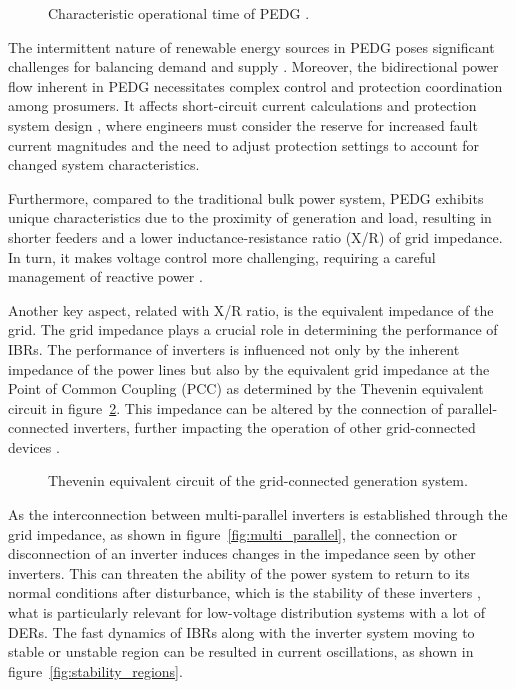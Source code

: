 \begin{figure}[ht]
    \caption{Characteristic operational time of PEDG \autocite{misc_karawita_2024}.}\label{fig:pedg_time}
\end{figure}

The intermittent nature of renewable energy sources in PEDG poses significant challenges for balancing demand and supply \autocite{7790991,7442160}. Moreover, the bidirectional power flow inherent in PEDG necessitates complex control and protection coordination among prosumers. It affects short-circuit current calculations and protection system design \autocite{4112346}, where engineers must consider the reserve for increased fault current magnitudes and the need to adjust protection settings to account for changed system characteristics. 

Furthermore, compared to the traditional bulk power system, PEDG exhibits unique characteristics due to the proximity of generation and load, resulting in shorter feeders and a lower inductance-resistance ratio (X/R) of grid impedance. In turn, it makes voltage control more challenging, requiring a careful management of reactive power \autocite{7749289}. 

Another key aspect, related with X/R ratio, is the equivalent impedance of the grid. The grid impedance plays a crucial role in determining the performance of IBRs. The performance of inverters is influenced not only by the inherent impedance of the power lines but also by the equivalent grid impedance at the Point of Common Coupling (PCC) as determined by the Thevenin equivalent circuit in figure~\cref{fig:thevenin}. This impedance can be altered by the connection of parallel-connected inverters, further impacting the operation of other grid-connected devices \autocite{Jayasinghe2021}.


\begin{figure}[ht]
    \caption{Thevenin equivalent circuit of the grid-connected generation system.}\label{fig:thevenin}
\end{figure}

As the interconnection between multi-parallel inverters is established through the grid impedance, as shown in figure~\cref{fig:multi_parallel}, the connection or disconnection of an inverter induces changes in the impedance seen by other inverters. This can threaten the ability of the power system to return to its normal conditions after disturbance, which is the stability of these inverters \autocite{10615092}, what is particularly relevant for low-voltage distribution systems with a lot of DERs. The fast dynamics of IBRs along with the inverter system moving to stable or unstable region can be resulted in current oscillations, as shown in figure~\cref{fig:stability_regions}.

